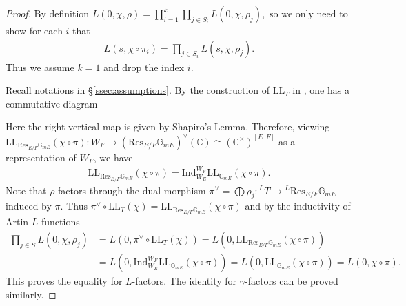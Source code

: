 \documentclass[10pt]{amsart}
\theoremstyle{definition}
\numberwithin{equation}{section}
\DeclareMathOperator{\Gal}{\mathrm{Gal}}
\numberwithin{equation}{subsection}
\newcommand{\Ind}{\mathrm{Ind}}
\newcommand{\CC}{\mathbb{C}}
\newcommand{\GG}{\mathbb{G}}
\newcommand{\Temp}{\mathrm{Temp}}
\begin{document}
\begin{proof} 
By definition $L(0,\chi,\rho) = \prod_{i=1}^k\prod_{j\in S_i} L(0,\chi,\rho_j),$
so we only need to show for each $i$ that
\begin{align*}
    L(s,\chi\circ \pi_i) = \prod_{j\in S_i} L(s,\chi,\rho_j).
\end{align*}
Thus we assume $k=1$ and drop the index $i$.

Recall notations in \S \ref{ssec:assumptions}. By the construction of $\mathrm{LL}_T$ in \cite{Langlands:tori}, one has a commutative diagram
\begin{center}
\end{center}
Here the right vertical map is given by Shapiro's Lemma. Therefore, viewing $\mathrm{LL}_{\mathrm{Res}_{E/F}\mathbb{G}_{mE}}(\chi\circ \pi): W_F\to (\mathrm{Res}_{E/F}\mathbb{G}_{mE})^\vee(\CC)\cong (\CC^\times)^{[E:F]}$ as a representation of $W_F$, we have
\begin{align*}
    \mathrm{LL}_{\mathrm{Res}_{E/F}\mathbb{G}_{mE}}(\chi\circ\pi) = \Ind_{W_{E}}^{W_F}\mathrm{LL}_{\mathbb{G}_{mE}}(\chi\circ\pi).
\end{align*}
Note that $\rho$ factors through the dual morphism $\pi^\lor=\bigoplus \rho_j:{}^LT\longrightarrow {}^L\mathrm{Res}_{E/F}\GG_{mE}$ induced by $\pi.$ Thus $\pi^\vee\circ\mathrm{LL}_{T}(\chi) = \mathrm{LL}_{\mathrm{Res}_{E/F}\mathbb{G}_{mE}}(\chi\circ\pi)$ and by the inductivity of Artin $L$-functions
\begin{align*}
     \prod_{j\in S} L(0,\chi,\rho_j)&=L(0,\pi^\vee\circ\mathrm{LL}_{T}(\chi))=L(0, \mathrm{LL}_{\mathrm{Res}_{E/F}\mathbb{G}_{mE}}(\chi\circ\pi))\\
     &=L(0,\Ind_{W_{E}}^{W_F}\mathrm{LL}_{\mathbb{G}_{mE}}(\chi\circ\pi)) = L(0,\mathrm{LL}_{\mathbb{G}_{mE}}(\chi\circ\pi)) = L(0,\chi\circ\pi).
\end{align*}
This proves the equality for $L$-factors. The identity for $\gamma$-factors can be proved similarly.

\end{proof}
\end{document}
